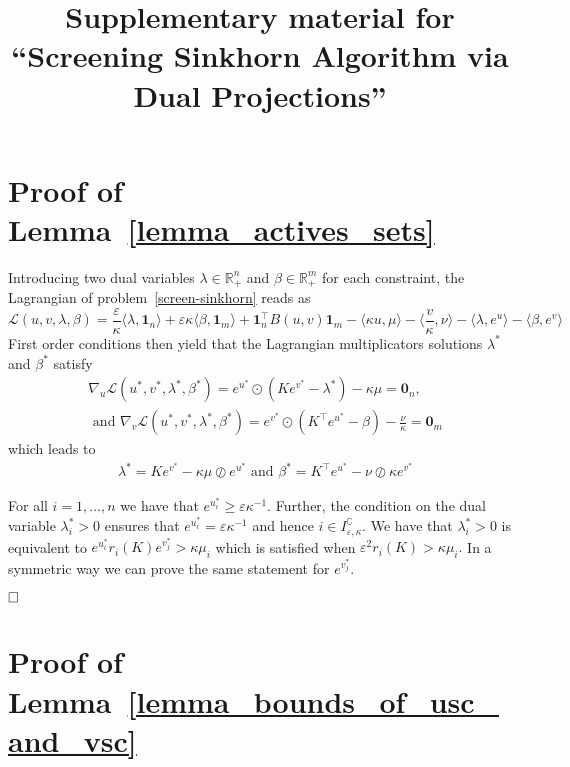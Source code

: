 \documentclass{article}
\title{Supplementary material for ``Screening Sinkhorn Algorithm via Dual Projections''}
\newcommand{\inr}[1]{\langle #1 \rangle}
\newcommand{\R}{{\mathbb{R}}}
\begin{document}
\maketitle

\section{Proof of Lemma~\ref{lemma_actives_sets}}

Introducing two dual variables $\lambda \in \R^n_{+}$ and $\beta \in \R^m_{+}$ for each constraint, the Lagrangian of problem~\eqref{screen-sinkhorn} reads as 
\begin{equation*}
  \mathscr{L}(u,v, \lambda, \beta) = \frac \varepsilon\kappa\inr{\lambda, \mathbf{1}_n} + \varepsilon\kappa\inr{\beta, \mathbf{1}_m} + \mathbf{1}_n^\top B(u,v) \mathbf{1}_m - \inr{\kappa u, \mu} - \inr{\frac v\kappa, \nu} -\inr{\lambda,e^{u}} - \inr{\beta,e^{v}}
\end{equation*}
First order conditions then yield that the Lagrangian multiplicators solutions $\lambda^{*}$ and $\beta^{*}$ satisfy 
\begin{align*}
  &\nabla_u\mathscr{L}(u^{*},v^{*}, \lambda^{*}, \beta^{*})=  e^{u^{*}} \odot(Ke^{v^{*}} - \lambda^{*}) - \kappa\mu = \mathbf 0_n,\\
  & \text{ and } \nabla_v\mathscr{L}(u^{*},v^{*}, \lambda^{*}, \beta^{*})=  e^{v^{*}} \odot(K^\top e^{u^{*}} - \beta) - \frac \nu\kappa = \mathbf 0_m
\end{align*}
which leads to 
\begin{align*}
  &\lambda^{*} = K e^{v^{*}} - \kappa\mu \oslash e^{u^{*}} \text{ and }
  \beta^{*} = K^\top e^{u^{*}} - \nu \oslash \kappa e^{v^{*}}
\end{align*}

For all $i=1, \ldots, n$ we have that $e^{u^{*}_i} \geq \varepsilon\kappa^{-1}$. Further, the condition on the dual variable $\lambda^{*}_i > 0$  ensures that $e^{u^{*}_i} = \varepsilon\kappa^{-1}$ and hence $i \in I^\complement_{\varepsilon,\kappa}$. We have that $\lambda^{*}_i > 0$ is equivalent to $e^{u^{*}_i}r_i(K) e^{v^{*}_j} >  \kappa{\mu_i}$ which  is satisfied when $\varepsilon^2r_i(K) >  \kappa{\mu_i}.$  
In a symmetric way we can prove the same statement for $e^{v^{*}_j}$.

$\hfill\square$


\section{Proof of Lemma~\ref{lemma_bounds_of_usc_and_vsc}}
\end{document}
